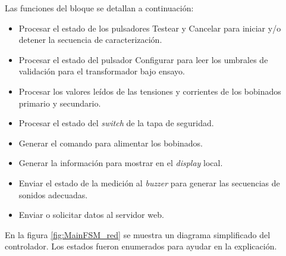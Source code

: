 Las funciones del bloque se detallan a continuación:

\begin{itemize}
\item Procesar el estado de los pulsadores Testear y Cancelar para iniciar y/o detener la secuencia de caracterización.
\item Procesar el estado del pulsador Configurar para leer los umbrales de validación para el transformador bajo ensayo.
\item Procesar los valores leídos de las tensiones y corrientes de los bobinados primario y secundario.
\item Procesar el estado del \textit{switch} de la tapa de seguridad.
\item Generar el comando para alimentar los bobinados.
\item Generar la información para mostrar en el \textit{display} local.
\item Enviar el estado de la medición al \textit{buzzer} para generar las secuencias de sonidos adecuadas.
\item Enviar o solicitar datos al servidor web.
\end{itemize}

En la figura \ref{fig:MainFSM_red} se muestra un diagrama simplificado del controlador. Los estados fueron enumerados para ayudar en la explicación.

